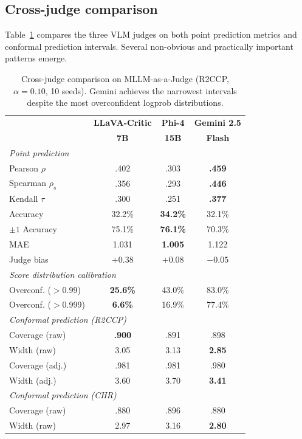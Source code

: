 \documentclass{article}
\begin{document}
\subsection{Cross-judge comparison}
\label{sec:cross_judge}

Table~\ref{tab:cross_judge} compares the three VLM judges on both point prediction metrics and conformal prediction intervals. Several non-obvious and practically important patterns emerge.

\begin{table}[t]
\centering
\caption{Cross-judge comparison on MLLM-as-a-Judge (R2CCP, $\alpha=0.10$, 10 seeds). Gemini achieves the narrowest intervals despite the most overconfident logprob distributions.}
\label{tab:cross_judge}
\small
\begin{tabular}{lccc}
\toprule
& \textbf{LLaVA-Critic} & \textbf{Phi-4} & \textbf{Gemini 2.5} \\
& \textbf{7B} & \textbf{15B} & \textbf{Flash} \\
\midrule
\multicolumn{4}{l}{\emph{Point prediction}} \\
Pearson $\rho$ & .402 & .303 & \textbf{.459} \\
Spearman $\rho_s$ & .356 & .293 & \textbf{.446} \\
Kendall $\tau$ & .300 & .251 & \textbf{.377} \\
Accuracy & 32.2\% & \textbf{34.2\%} & 32.1\% \\
$\pm 1$ Accuracy & 75.1\% & \textbf{76.1\%} & 70.3\% \\
MAE & 1.031 & \textbf{1.005} & 1.122 \\
Judge bias & $+0.38$ & $+0.08$ & $\mathbf{-0.05}$ \\
\midrule
\multicolumn{4}{l}{\emph{Score distribution calibration}} \\
Overconf. ($>$0.99) & \textbf{25.6\%} & 43.0\% & 83.0\% \\
Overconf. ($>$0.999) & \textbf{6.6\%} & 16.9\% & 77.4\% \\
\midrule
\multicolumn{4}{l}{\emph{Conformal prediction (R2CCP)}} \\
Coverage (raw) & \textbf{.900} & .891 & .898 \\
Width (raw) & 3.05 & 3.13 & \textbf{2.85} \\
Coverage (adj.) & .981 & .981 & .980 \\
Width (adj.) & 3.60 & 3.70 & \textbf{3.41} \\
\midrule
\multicolumn{4}{l}{\emph{Conformal prediction (CHR)}} \\
Coverage (raw) & .880 & .896 & .880 \\
Width (raw) & 2.97 & 3.16 & \textbf{2.80} \\
\bottomrule
\end{tabular}
\end{table}
\end{document}
